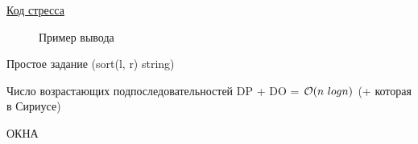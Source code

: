 \down

\href{https://pastebin.com/cRGvAuPJ}{Код стресса}

\begin{center}
	\begin{figure}[h]
		\captionsetup{font=small, labelformat=empty}
		\caption{Пример вывода}
		\label{fig:image}
	\end{figure}
\end{center}



Простое задание (sort(l, r) string)

Число возрастающих подпоследовательностей DP + DO = $\mathcal{O}(n \ log n)$ (+ которая в Сириусе)

ОКНА

